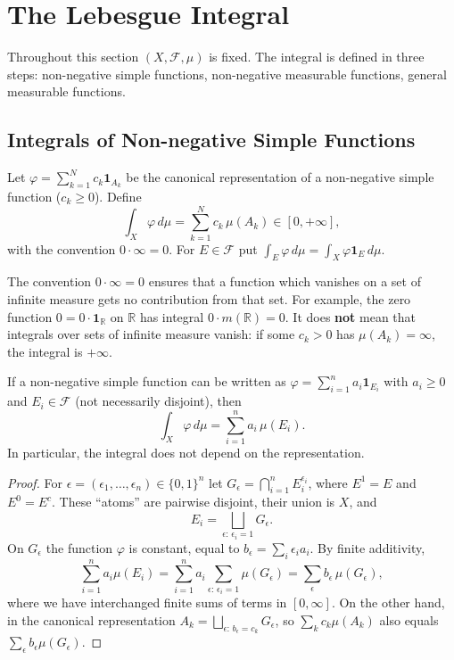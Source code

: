 \documentclass[11pt]{article}
\makeatletter
\newcommand{\envlabel}[1]{\protected@edef\@currentlabel{\themathenv}\label{#1}}
\makeatother
\begin{document}
\section{The Lebesgue Integral}

Throughout this section $(X,\mathcal{F},\mu)$ is fixed. The integral is defined in three steps: non-negative simple functions, non-negative measurable functions, general measurable functions.

\subsection{Integrals of Non-negative Simple Functions}

\begin{definition}
Let $\varphi=\sum_{k=1}^{N}c_{k}\mathbf{1}_{A_{k}}$ be the canonical representation of a non-negative simple function ($c_{k}\geq0$). Define
\[
\int_{X}\varphi\,d\mu=\sum_{k=1}^{N}c_{k}\,\mu(A_{k})\in[0,+\infty],
\]
with the convention $0\cdot\infty=0$. For $E\in\mathcal{F}$ put $\int_{E}\varphi\,d\mu=\int_{X}\varphi\mathbf{1}_{E}\,d\mu$.
\end{definition}

\begin{remark}
The convention $0\cdot\infty=0$ ensures that a function which vanishes on a set of infinite measure gets no contribution from that set. For example, the zero function $0=0\cdot\mathbf{1}_{\mathbb{R}}$ on $\mathbb{R}$ has integral $0\cdot m(\mathbb{R})=0$. It does \textbf{not} mean that integrals over sets of infinite measure vanish: if some $c_{k}>0$ has $\mu(A_{k})=\infty$, the integral is $+\infty$.
\end{remark}

\begin{lemma}\envlabel{en:lem:repr}
If a non-negative simple function can be written as $\varphi=\sum_{i=1}^{n}a_{i}\mathbf{1}_{E_{i}}$ with $a_{i}\geq0$ and $E_{i}\in\mathcal{F}$ (not necessarily disjoint), then
\[
\int_{X}\varphi\,d\mu=\sum_{i=1}^{n}a_{i}\,\mu(E_{i}).
\]
In particular, the integral does not depend on the representation.
\end{lemma}

\begin{proof}
For $\epsilon=(\epsilon_{1},\ldots,\epsilon_{n})\in\{0,1\}^{n}$ let $G_{\epsilon}=\bigcap_{i=1}^{n}E_{i}^{\epsilon_{i}}$, where $E^{1}=E$ and $E^{0}=E^{c}$. These ``atoms'' are pairwise disjoint, their union is $X$, and
\[
E_{i}=\bigsqcup_{\epsilon:\,\epsilon_{i}=1}G_{\epsilon}.
\]
On $G_{\epsilon}$ the function $\varphi$ is constant, equal to $b_{\epsilon}=\sum_{i}\epsilon_{i}a_{i}$. By finite additivity,
\[
\sum_{i=1}^{n}a_{i}\mu(E_{i})=\sum_{i=1}^{n}a_{i}\sum_{\epsilon:\,\epsilon_{i}=1}\mu(G_{\epsilon})=\sum_{\epsilon}b_{\epsilon}\,\mu(G_{\epsilon}),
\]
where we have interchanged finite sums of terms in $[0,\infty]$. On the other hand, in the canonical representation $A_{k}=\bigsqcup_{\epsilon:\,b_{\epsilon}=c_{k}}G_{\epsilon}$, so $\sum_{k}c_{k}\mu(A_{k})$ also equals $\sum_{\epsilon}b_{\epsilon}\mu(G_{\epsilon})$.
\end{proof}
\end{document}
